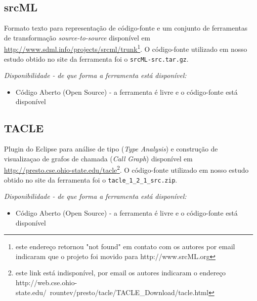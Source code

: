 \subsection{srcML}

Formato texto para representação de código-fonte e um conjunto de
ferramentas de transformação {\it source-to-source} disponível em
\url{http://www.sdml.info/projects/srcml/trunk}\footnote{este endereço
retornou "not found" em contato com os autores por email indicaram que o
projeto foi movido para http://www.srcML.org}. O código-fonte utilizado em
nosso estudo obtido no site da ferramenta foi o \texttt{srcML-src.tar.gz}.

\begin{description}

  \item {\it Disponibilidade - de que forma a ferramenta está disponível:}
    \begin{itemize}
      \item Código Aberto (Open Source) - a ferramenta é livre e o código-fonte está disponível
    \end{itemize}

\end{description}

\subsection{TACLE}

Plugin do Eclipse para análise de tipo ({\it Type Analysis}) e
construção de visualizaçao de grafos de chamada ({\it Call Graph}) disponível em
\url{http://presto.cse.ohio-state.edu/tacle}\footnote{este link está
indisponível, por email os autores indicaram o endereço
http://web.cse.ohio-state.edu/~rountev/presto/tacle/TACLE\_Download/tacle.html}.
O código-fonte utilizado em nosso estudo obtido no site da ferramenta foi o
\texttt{tacle\_1\_2\_1\_src.zip}.

\begin{description}

  \item {\it Disponibilidade - de que forma a ferramenta está disponível:}
    \begin{itemize}
      \item Código Aberto (Open Source) - a ferramenta é livre e o código-fonte está disponível
    \end{itemize}

\end{description}

